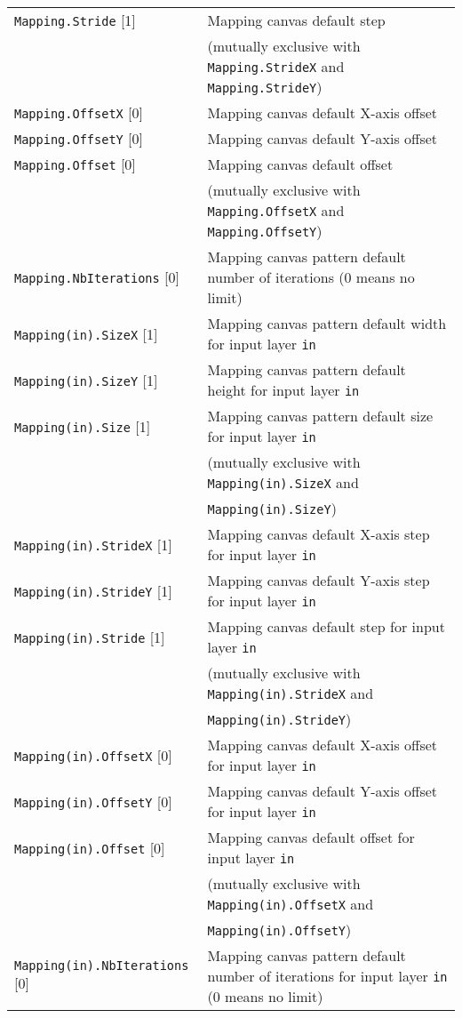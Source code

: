 \documentclass[a4paper,11pt,oneside]{article}
\begin{document}
\begin{center}
\begin{longtable}{| p{5cm} | p{10cm} | }
  \lstinline!Mapping.Stride! [1] & Mapping canvas default step \\
   & (mutually exclusive with \lstinline!Mapping.StrideX!
   and \lstinline!Mapping.StrideY!) \\
  \lstinline!Mapping.OffsetX! [0] & Mapping canvas default X-axis offset \\
  \lstinline!Mapping.OffsetY! [0] & Mapping canvas default Y-axis offset \\
  \lstinline!Mapping.Offset! [0] & Mapping canvas default offset \\
   & (mutually exclusive with \lstinline!Mapping.OffsetX!
   and \lstinline!Mapping.OffsetY!) \\
  \lstinline!Mapping.NbIterations! [0] & Mapping canvas pattern default number
   of iterations (0 means no limit) \\
  \lstinline!Mapping(in).SizeX! [1] & Mapping canvas pattern default width
  for input layer \lstinline!in! \\
  \lstinline!Mapping(in).SizeY! [1] & Mapping canvas pattern default height
   for input layer \lstinline!in! \\
  \lstinline!Mapping(in).Size! [1] & Mapping canvas pattern default size
  for input layer \lstinline!in! \\
   & (mutually exclusive with \lstinline!Mapping(in).SizeX! and \\
   & \lstinline!Mapping(in).SizeY!) \\
  \lstinline!Mapping(in).StrideX! [1] & Mapping canvas default X-axis step
   for input layer \lstinline!in! \\
  \lstinline!Mapping(in).StrideY! [1] & Mapping canvas default Y-axis step
  for input layer \lstinline!in! \\
  \lstinline!Mapping(in).Stride! [1] & Mapping canvas default step
  for input layer \lstinline!in! \\
   & (mutually exclusive with \lstinline!Mapping(in).StrideX! and \\
   & \lstinline!Mapping(in).StrideY!) \\
  \lstinline!Mapping(in).OffsetX! [0] & Mapping canvas default X-axis offset
  for input layer \lstinline!in! \\
  \lstinline!Mapping(in).OffsetY! [0] & Mapping canvas default Y-axis offset
  for input layer \lstinline!in! \\
  \lstinline!Mapping(in).Offset! [0] & Mapping canvas default offset for input
   layer \lstinline!in! \\
   & (mutually exclusive with \lstinline!Mapping(in).OffsetX! and \\
   & \lstinline!Mapping(in).OffsetY!) \\
  \lstinline!Mapping(in).NbIterations! [0] & Mapping canvas pattern default
  number of iterations for input layer \lstinline!in! (0 means no limit) \\
 \hline
\end{longtable}
\end{center}
\end{document}
